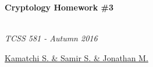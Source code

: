 \documentclass{article}[12]
\numberwithin{equation}{section}
\begin{document}
\begin{center}
\begin{huge} \textbf{Cryptology Homework \#3} \end{huge} \\
\emph{TCSS 581 - Autumn 2016} 
\end{center}
\begin{center}
\begin{large} \underline{Kamatchi S. \& Samir S. \& Jonathan M.} \end{large}
\end{center}
\vspace{0.5in}


\begin{flushleft}



\vspace{0.25in}




\vspace{0.25in}




\vspace{0.25in}




\vspace{0.25in}




\vspace{0.25in}




\vspace{0.25in}




\vspace{0.25in}




\vspace{0.25in}




\newpage

















\newpage




\end{flushleft}
\end{document}
